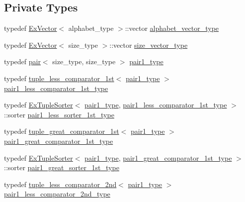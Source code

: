 \subsection*{Private Types}
\begin{DoxyCompactItemize}
\item 
typedef \hyperlink{struct_ex_vector}{Ex\+Vector}$<$ alphabet\+\_\+type $>$\+::vector \hyperlink{class_validate4_a49c80b3d101be19542a4341c2387603a}{alphabet\+\_\+vector\+\_\+type}
\item 
typedef \hyperlink{struct_ex_vector}{Ex\+Vector}$<$ size\+\_\+type $>$\+::vector \hyperlink{class_validate4_a46ea31a0a4b23f583806792160421d15}{size\+\_\+vector\+\_\+type}
\item 
typedef \hyperlink{structpair}{pair}$<$ size\+\_\+type, size\+\_\+type $>$ \hyperlink{class_validate4_aaa2fcb80a05115eb4ca02ab23df8827e}{pair1\+\_\+type}
\item 
typedef \hyperlink{structtuple__less__comparator__1st}{tuple\+\_\+less\+\_\+comparator\+\_\+1st}$<$ \hyperlink{class_validate4_aaa2fcb80a05115eb4ca02ab23df8827e}{pair1\+\_\+type} $>$ \hyperlink{class_validate4_af01005bf9ba711e95fc52fc41e323716}{pair1\+\_\+less\+\_\+comparator\+\_\+1st\+\_\+type}
\item 
typedef \hyperlink{struct_ex_tuple_sorter}{Ex\+Tuple\+Sorter}$<$ \hyperlink{class_validate4_aaa2fcb80a05115eb4ca02ab23df8827e}{pair1\+\_\+type}, \hyperlink{class_validate4_af01005bf9ba711e95fc52fc41e323716}{pair1\+\_\+less\+\_\+comparator\+\_\+1st\+\_\+type} $>$\+::sorter \hyperlink{class_validate4_a40b1f73557cfa4c0b26f56f5038a4c5c}{pair1\+\_\+less\+\_\+sorter\+\_\+1st\+\_\+type}
\item 
typedef \hyperlink{structtuple__great__comparator__1st}{tuple\+\_\+great\+\_\+comparator\+\_\+1st}$<$ \hyperlink{class_validate4_aaa2fcb80a05115eb4ca02ab23df8827e}{pair1\+\_\+type} $>$ \hyperlink{class_validate4_a3a6678b617cc9e0d65b36595cdd12a83}{pair1\+\_\+great\+\_\+comparator\+\_\+1st\+\_\+type}
\item 
typedef \hyperlink{struct_ex_tuple_sorter}{Ex\+Tuple\+Sorter}$<$ \hyperlink{class_validate4_aaa2fcb80a05115eb4ca02ab23df8827e}{pair1\+\_\+type}, \hyperlink{class_validate4_a3a6678b617cc9e0d65b36595cdd12a83}{pair1\+\_\+great\+\_\+comparator\+\_\+1st\+\_\+type} $>$\+::sorter \hyperlink{class_validate4_ac379442c631fdd03a2e64223cea2c911}{pair1\+\_\+great\+\_\+sorter\+\_\+1st\+\_\+type}
\item 
typedef \hyperlink{structtuple__less__comparator__2nd}{tuple\+\_\+less\+\_\+comparator\+\_\+2nd}$<$ \hyperlink{class_validate4_aaa2fcb80a05115eb4ca02ab23df8827e}{pair1\+\_\+type} $>$ \hyperlink{class_validate4_a67166f1b6f64e5d8887d9a5aa6072346}{pair1\+\_\+less\+\_\+comparator\+\_\+2nd\+\_\+type}

\end{DoxyCompactItemize}
